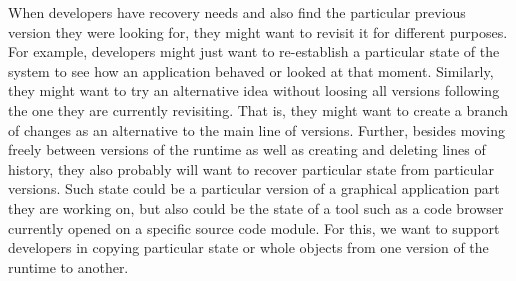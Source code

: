 When developers have recovery needs and also find the particular previous version they were looking for, they might want to revisit it for different purposes.
For example, developers might just want to re-establish a particular state of the system to see how an application behaved or looked at that moment.
Similarly, they might want to try an alternative idea without loosing all versions following the one they are currently revisiting.
That is, they might want to create a branch of changes as an alternative to the main line of versions.
Further, besides moving freely between versions of the runtime as well as creating and deleting lines of history, they also probably will want to recover particular state from particular versions.
Such state could be a particular version of a graphical application part they are working on, but also could be the state of a tool such as a code browser currently opened on a specific source code module.
For this, we want to support developers in copying particular state or whole objects from one version of the runtime to another.

